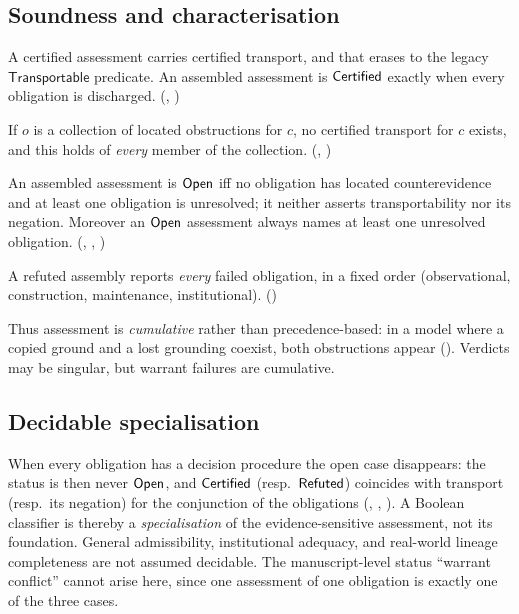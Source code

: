\subsection{Soundness and characterisation}
\begin{theorem}\label{thm:certsound}
A certified assessment carries certified transport, and that erases to the legacy $\mathsf{Transportable}$ predicate. An assembled assessment is $\mathsf{Certified}$ exactly when every obligation is discharged. (, )
\end{theorem}
\begin{theorem}\label{thm:refsound}
If $o$ is a collection of located obstructions for $c$, no certified transport for $c$ exists, and this holds of \emph{every} member of the collection. (, )
\end{theorem}
\begin{theorem}\label{thm:open}
An assembled assessment is $\mathsf{Open}$ iff no obligation has located counterevidence and at least one obligation is unresolved; it neither asserts transportability nor its negation. Moreover an $\mathsf{Open}$ assessment always names at least one unresolved obligation. (, , )
\end{theorem}
\begin{theorem}\label{thm:allfail}
A refuted assembly reports \emph{every} failed obligation, in a fixed order (observational, construction, maintenance, institutional). ()
\end{theorem}
Thus assessment is \emph{cumulative} rather than precedence-based: in a model where a copied ground and a lost grounding coexist, both obstructions appear (). Verdicts may be singular, but warrant failures are cumulative.

\subsection{Decidable specialisation}
When every obligation has a decision procedure the open case disappears: the status is then never $\mathsf{Open}$, and $\mathsf{Certified}$ (resp.\ $\mathsf{Refuted}$) coincides with transport (resp.\ its negation) for the conjunction of the obligations (, , ). A Boolean classifier is thereby a \emph{specialisation} of the evidence-sensitive assessment, not its foundation. General admissibility, institutional adequacy, and real-world lineage completeness are not assumed decidable. The manuscript-level status ``warrant conflict'' cannot arise here, since one assessment of one obligation is exactly one of the three cases.
